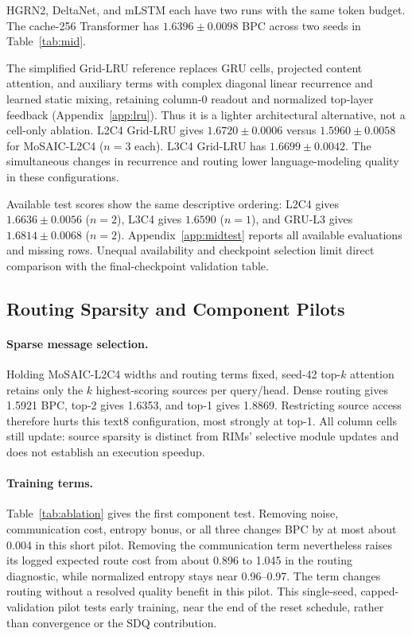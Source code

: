 \documentclass[letterpaper,twoside]{article}
\begin{document}
HGRN2, DeltaNet, and mLSTM each have two runs with the same token budget. The cache-256 Transformer has $1.6396\pm0.0098$ BPC across two seeds in Table~\ref{tab:mid}.

The simplified Grid-LRU reference replaces GRU cells, projected content attention, and auxiliary terms with complex diagonal linear recurrence and learned static mixing, retaining column-0 readout and normalized top-layer feedback (Appendix~\ref{app:lru}). Thus it is a lighter architectural alternative, not a cell-only ablation. L2C4 Grid-LRU gives $1.6720\pm0.0006$ versus $1.5960\pm0.0058$ for MoSAIC-L2C4 ($n=3$ each). L3C4 Grid-LRU has $1.6699\pm0.0042$. The simultaneous changes in recurrence and routing lower language-modeling quality in these configurations.

Available test scores show the same descriptive ordering: L2C4 gives $1.6636\pm0.0056$ ($n=2$), L3C4 gives $1.6590$ ($n=1$), and GRU-L3 gives $1.6814\pm0.0068$ ($n=2$). Appendix~\ref{app:midtest} reports all available evaluations and missing rows. Unequal availability and checkpoint selection limit direct comparison with the final-checkpoint validation table.

\subsection{Routing Sparsity and Component Pilots}\label{sec:ablation}

\paragraph{Sparse message selection.}
Holding MoSAIC-L2C4 widths and routing terms fixed, seed-42 top-$k$ attention retains only the $k$ highest-scoring sources per query/head. Dense routing gives 1.5921 BPC, top-2 gives 1.6353, and top-1 gives 1.8869. Restricting source access therefore hurts this text8 configuration, most strongly at top-1. All column cells still update: source sparsity is distinct from RIMs' selective module updates and does not establish an execution speedup.



\paragraph{Training terms.}
Table~\ref{tab:ablation} gives the first component test. Removing noise, communication cost, entropy bonus, or all three changes BPC by at most about 0.004 in this short pilot. Removing the communication term nevertheless raises its logged expected route cost from about 0.896 to 1.045 in the routing diagnostic, while normalized entropy stays near 0.96--0.97. The term changes routing without a resolved quality benefit in this pilot. This single-seed, capped-validation pilot tests early training, near the end of the reset schedule, rather than convergence or the SDQ contribution.
\end{document}
